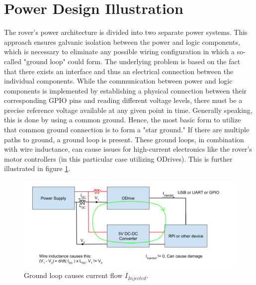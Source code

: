     \clearpage %
    
\section{Power Design Illustration}

    The rover's power architecture is divided into two separate power systems. This approach ensures galvanic isolation between the power and logic components, which is necessary to eliminate any possible wiring configuration in which a so-called "ground loop" could form. The underlying problem is based on the fact that there exists an interface and thus an electrical connection between the individual components. While the communication between power and logic components is implemented by establishing a physical connection between their corresponding GPIO pins and reading different voltage levels, there must be a precise reference voltage available at any given point in time. Generally speaking, this is done by using a common ground. Hence, the most basic form to utilize that common ground connection is to form a "star ground." If there are multiple paths to ground, a ground loop is present. These ground loops, in combination with wire inductance, can cause issues for high-current electronics like the rover's motor controllers (in this particular case utilizing ODrives). This is further illustrated in figure \ref{ground_loop_bad}.
    
    \begin{figure}[h] %
        \includegraphics[width=\textwidth]{contents/figures/ground_loop_bad.png}
        \caption{Ground loop causes current flow $I_{Injected}$.}
        \label{ground_loop_bad}
    \end{figure}
    
